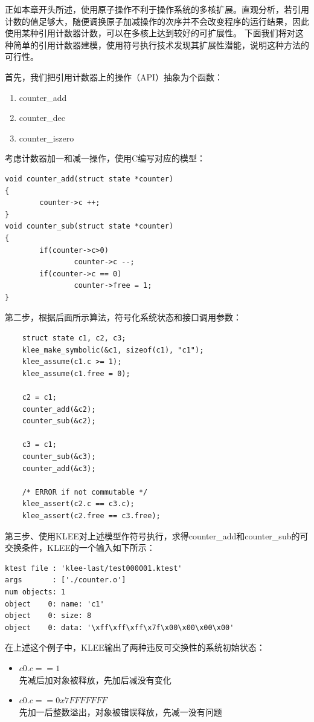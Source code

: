 正如本章开头所述，使用原子操作不利于操作系统的多核扩展。直观分析，若引用计数的值足够大，随便调换原子加减操作的次序并不会改变程序的运行结果，因此使用某种引用计数器计数，可以在多核上达到较好的可扩展性。
下面我们将对这种简单的引用计数器建模，使用符号执行技术发现其扩展性潜能，说明这种方法的可行性。

首先，我们把引用计数器上的操作（API）抽象为个函数：
\begin{enumerate}
\item counter\_add
\item counter\_dec
\item counter\_iszero
\end{enumerate}

考虑计数器加一和减一操作，使用C编写对应的模型：

\begin{lstlisting}
void counter_add(struct state *counter)
{
        counter->c ++;
}
void counter_sub(struct state *counter)
{
        if(counter->c>0)
                counter->c --;
        if(counter->c == 0)
                counter->free = 1;
}
\end{lstlisting}

第二步，根据后面\label{subsec:comm-alg}所示算法，符号化系统状态和接口调用参数：

\begin{lstlisting}
	struct state c1, c2, c3;
	klee_make_symbolic(&c1, sizeof(c1), "c1");
	klee_assume(c1.c >= 1);
	klee_assume(c1.free = 0);

	c2 = c1;
	counter_add(&c2);
	counter_sub(&c2);

	c3 = c1;
	counter_sub(&c3);
	counter_add(&c3);

	/* ERROR if not commutable */
	klee_assert(c2.c == c3.c);
	klee_assert(c2.free == c3.free);
\end{lstlisting}

第三步、使用KLEE对上述模型作符号执行，求得counter\_add和counter\_sub的可交换条件，KLEE的一个输入如下所示：

	\begin{lstlisting}[caption=KLEE输出样例]
ktest file : 'klee-last/test000001.ktest'
args       : ['./counter.o']
num objects: 1
object    0: name: 'c1'
object    0: size: 8
object    0: data: '\xff\xff\xff\x7f\x00\x00\x00\x00'
	\end{lstlisting}

在上述这个例子中，KLEE输出了两种违反可交换性的系统初始状态：
\begin{itemize}
	\item ${c0.c == 1}$ \\
		先减后加对象被释放，先加后减没有变化
	\item ${c0.c ==
		0x7FFFFFFF}$ \\
		先加一后整数溢出，对象被错误释放，先减一没有问题
\end{itemize}

